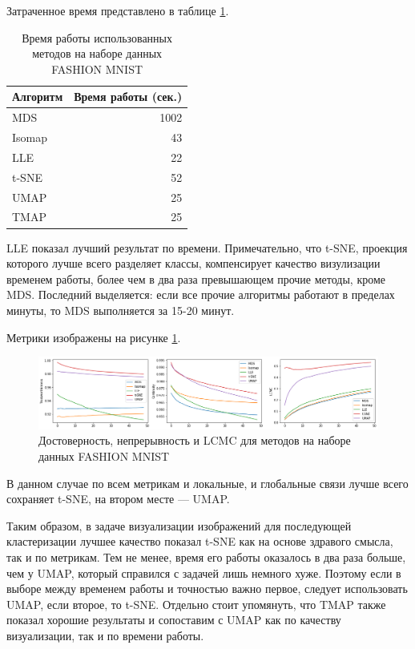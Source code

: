 \documentclass[10pt, a4paper]{extarticle}
\begin{document}
Затраченное время представлено в таблице \ref{tab:fmnist_time}.
\begin{table}[h!]
    \centering
    \begin{tabular}{l r}
        \toprule
         Алгоритм & Время работы (сек.)  \\
         \midrule
         MDS & 1002 \\
         Isomap & 43 \\
         LLE & 22 \\
         t-SNE & 52 \\
         UMAP & 25 \\
         TMAP & 25 \\
         \bottomrule
    \end{tabular}
    \caption{Время работы использованных методов на наборе данных FASHION MNIST}
    \label{tab:fmnist_time}
\end{table}

LLE показал лучший результат по времени. Примечательно, что t-SNE, проекция которого лучше всего разделяет классы, компенсирует качество визулизации временем работы, более чем в два раза превышающем прочие методы, кроме MDS. Последний выделяется: если все прочие алгоритмы работают в пределах минуты, то MDS выполняется за 15-20 минут. 

Метрики изображены на рисунке \ref{fig:metrics_fmnist}.
\begin{figure}[h!]
    \centering
    \includegraphics[width=\linewidth]{fmnist_metrics.png}
    \caption{Достоверность, непрерывность и LCMC для методов на наборе данных FASHION MNIST}
    \label{fig:metrics_fmnist}
\end{figure}

В данном случае по всем метрикам и локальные, и глобальные связи лучше всего сохраняет t-SNE, на втором месте — UMAP. 

Таким образом, в задаче визуализации изображений для последующей кластеризации лучшее качество показал t-SNE как на основе здравого смысла, так и по метрикам. Тем не менее, время его работы оказалось в два раза больше, чем у UMAP, который справился с задачей лишь немного хуже. Поэтому если в выборе между временем работы и точностью важно первое, следует использовать UMAP, если второе, то t-SNE. Отдельно стоит упомянуть, что TMAP также показал хорошие результаты и сопоставим с UMAP как по качеству визуализации, так и по времени работы.
\end{document}
